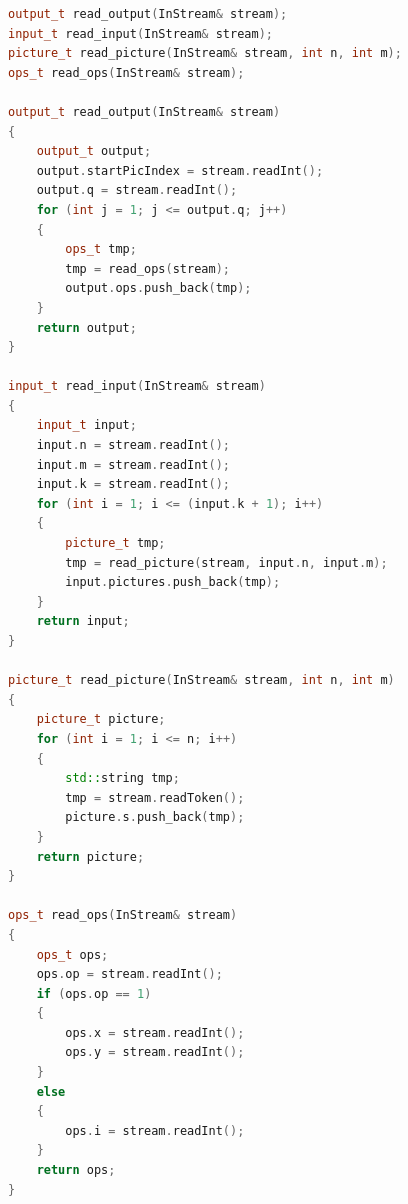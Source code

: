 \documentclass[times,specification,annotation]{style/itmo-student-thesis/itmo-student-thesis}
\begin{document}
\begin{lstlisting}[caption={Часть сгенерированного кода чекера на языке C++},label={gen-checker-cpp},language=C++]
output_t read_output(InStream& stream);
input_t read_input(InStream& stream);
picture_t read_picture(InStream& stream, int n, int m);
ops_t read_ops(InStream& stream);

output_t read_output(InStream& stream)
{
    output_t output;
    output.startPicIndex = stream.readInt();
    output.q = stream.readInt();
    for (int j = 1; j <= output.q; j++)
    {
        ops_t tmp;
        tmp = read_ops(stream);
        output.ops.push_back(tmp);
    }
    return output;
}

input_t read_input(InStream& stream)
{
    input_t input;
    input.n = stream.readInt();
    input.m = stream.readInt();
    input.k = stream.readInt();
    for (int i = 1; i <= (input.k + 1); i++)
    {
        picture_t tmp;
        tmp = read_picture(stream, input.n, input.m);
        input.pictures.push_back(tmp);
    }
    return input;
}

picture_t read_picture(InStream& stream, int n, int m)
{
    picture_t picture;
    for (int i = 1; i <= n; i++)
    {
        std::string tmp;
        tmp = stream.readToken();
        picture.s.push_back(tmp);
    }
    return picture;
}

ops_t read_ops(InStream& stream)
{
    ops_t ops;
    ops.op = stream.readInt();
    if (ops.op == 1)
    {
        ops.x = stream.readInt();
        ops.y = stream.readInt();
    }
    else
    {
        ops.i = stream.readInt();
    }
    return ops;
}
\end{lstlisting}
\end{document}
